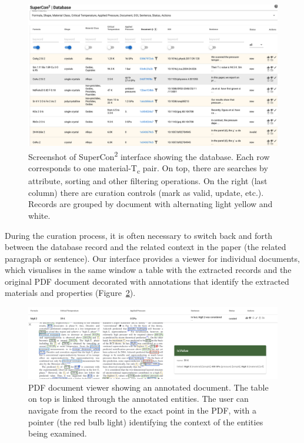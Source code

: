 \begin{figure}[ht]
  \centering
  \includegraphics[width=1\textwidth]{figures/curation/supercon-curation-database.png} 
  \caption{Screenshot of SuperCon\textsuperscript{2} interface showing the database. Each row corresponds to one material-T\textsubscript{c} pair. On top, there are searches by attribute, sorting and other filtering operations. On the right (last column) there are curation controls (mark as valid, update, etc.).   Records are grouped by document with alternating light yellow and white. }
  \label{fig:curation-interface-database}
\end{figure}

During the curation process, it is often necessary to switch back and forth between the database record and the related context in the paper (the related paragraph or sentence). 
Our interface provides a viewer for individual documents, which visualises in the same window a table with the extracted records and the original PDF document decorated with annotations that identify the extracted materials and properties (Figure~\ref{fig:pdf-view}). 

\begin{figure}[ht]
  \centering
  \includegraphics[width=1\textwidth]{figures/curation/pdf-view-context.png} 
  \caption{PDF document viewer showing an annotated document. The table on top is linked through the annotated entities. The user can navigate from the record to the exact point in the PDF, with a pointer (the red bulb light) identifying the context of the entities being examined. }
  \label{fig:pdf-view}
\end{figure}


